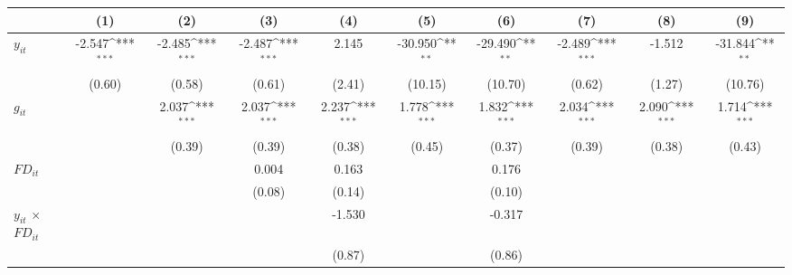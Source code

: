 \documentclass[12pt, a4paper]{article}
\begin{document}
	\begin{table}[htbp]
	\centering
	\scriptsize
	\setlength\tabcolsep{1pt}	
	\begin{threeparttable}
		{
			\def\sym#1{\ifmmode^{#1}\else\(^{#1}\)\fi}
			\begin{tabular}{l*{9}{c}}
				\hline\hline
				&\multicolumn{1}{c}{(1)}&\multicolumn{1}{c}{(2)}&\multicolumn{1}{c}{(3)}&\multicolumn{1}{c}{(4)}&\multicolumn{1}{c}{(5)}&\multicolumn{1}{c}{(6)}&\multicolumn{1}{c}{(7)}&\multicolumn{1}{c}{(8)}&\multicolumn{1}{c}{(9)}\\
				\hline
				$y_{it}$               &      -2.547\sym{***}&      -2.485\sym{***}&      -2.487\sym{***}&       2.145         &     -30.950\sym{**} &     -29.490\sym{**} &      -2.489\sym{***}&      -1.512         &     -31.844\sym{**} \\
				&      (0.60)         &      (0.58)         &      (0.61)         &      (2.41)         &     (10.15)         &     (10.70)         &      (0.62)         &      (1.27)         &     (10.76)         \\
				$g_{it}$             &                     &       2.037\sym{***}&       2.037\sym{***}&       2.237\sym{***}&       1.778\sym{***}&       1.832\sym{***}&       2.034\sym{***}&       2.090\sym{***}&       1.714\sym{***}\\
				&                     &      (0.39)         &      (0.39)         &      (0.38)         &      (0.45)         &      (0.37)         &      (0.39)         &      (0.38)         &      (0.43)         \\
				$FD_{it}$                &                     &                     &       0.004         &       0.163         &                     &       0.176         &                     &                     &                     \\
				&                     &                     &      (0.08)         &      (0.14)         &                     &      (0.10)         &                     &                     &                     \\
				$y_{it}$ $\times$ $FD_{it}$ &                     &                     &                     &      -1.530         &                     &      -0.317         &                     &                     &                     \\
				&                     &                     &                     &      (0.87)         &                     &      (0.86)         &                     &                     &                     \\

\end{tabular}}
\end{threeparttable}
\end{table}
\end{document}
